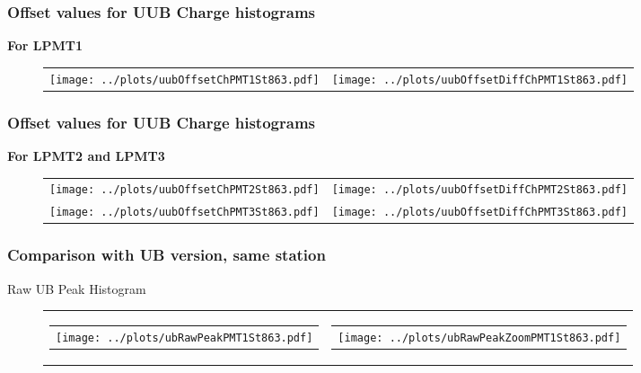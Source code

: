 \documentclass[aspectratio=169]{beamer}
\begin{document}

\begin{frame}
	\frametitle{Offset values for UUB Charge histograms}
	{\bf For LPMT1}
	\begin{figure}
		\centering
		\begin{tabularx}{\textwidth}{CC}
			\texttt{[image: ../plots/uubOffsetChPMT1St863.pdf]}
			&
			\texttt{[image: ../plots/uubOffsetDiffChPMT1St863.pdf]}
		\end{tabularx}
	\end{figure}
\end{frame}
			
			
\begin{frame}
	\frametitle{Offset values for UUB Charge histograms}
	{\bf For LPMT2 and LPMT3}
	\begin{figure}
		\centering
		\begin{tabularx}{\textwidth}{CC}
			\texttt{[image: ../plots/uubOffsetChPMT2St863.pdf]}
			&
			\texttt{[image: ../plots/uubOffsetDiffChPMT2St863.pdf]}
			\\
			\texttt{[image: ../plots/uubOffsetChPMT3St863.pdf]}
			&
			\texttt{[image: ../plots/uubOffsetDiffChPMT3St863.pdf]}
		\end{tabularx}
	\end{figure}
\end{frame}




\begin{frame}
	\frametitle{Comparison with UB version, same station}
	Raw UB Peak Histogram
	\begin{figure}
		\centering
		\begin{tabularx}{\textwidth}{CC}
			\begin{tabular}{l}
				\texttt{[image: ../plots/ubRawPeakPMT1St863.pdf]}
			\end{tabular}
			&
			\begin{tabular}{l}
				\texttt{[image: ../plots/ubRawPeakZoomPMT1St863.pdf]}
			\end{tabular}
		\end{tabularx}
	\end{figure}
\end{frame}
\end{document}
